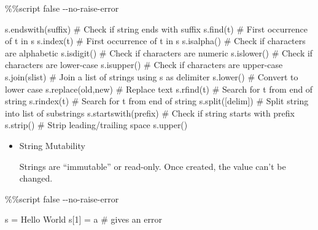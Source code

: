 \documentclass[
  letterpaper,
  DIV=11,
  numbers=noendperiod]{scrreprt}
\newenvironment{Shaded}{\begin{snugshade}}{\end{snugshade}}
\newcommand{\CommentTok}[1]{\textcolor[rgb]{0.37,0.37,0.37}{#1}}
\newcommand{\ControlFlowTok}[1]{\textcolor[rgb]{0.00,0.46,0.62}{#1}}
\newcommand{\DecValTok}[1]{\textcolor[rgb]{0.68,0.00,0.00}{#1}}
\newcommand{\NormalTok}[1]{\textcolor[rgb]{0.00,0.46,0.62}{#1}}
\newcommand{\OperatorTok}[1]{\textcolor[rgb]{0.37,0.37,0.37}{#1}}
\newcommand{\StringTok}[1]{\textcolor[rgb]{0.13,0.47,0.30}{#1}}
\begin{document}
\begin{Shaded}
\begin{Highlighting}[]
\OperatorTok{\%\%}\NormalTok{script false }\OperatorTok{{-}{-}}\NormalTok{no}\OperatorTok{{-}}\ControlFlowTok{raise}\OperatorTok{{-}}\NormalTok{error}

\NormalTok{s.endswith(suffix)     }\CommentTok{\# Check if string ends with suffix}
\NormalTok{s.find(t)              }\CommentTok{\# First occurrence of t in s}
\NormalTok{s.index(t)             }\CommentTok{\# First occurrence of t in s}
\NormalTok{s.isalpha()            }\CommentTok{\# Check if characters are alphabetic}
\NormalTok{s.isdigit()            }\CommentTok{\# Check if characters are numeric}
\NormalTok{s.islower()            }\CommentTok{\# Check if characters are lower{-}case}
\NormalTok{s.isupper()            }\CommentTok{\# Check if characters are upper{-}case}
\NormalTok{s.join(slist)          }\CommentTok{\# Join a list of strings using s as delimiter}
\NormalTok{s.lower()              }\CommentTok{\# Convert to lower case}
\NormalTok{s.replace(old,new)     }\CommentTok{\# Replace text}
\NormalTok{s.rfind(t)             }\CommentTok{\# Search for t from end of string}
\NormalTok{s.rindex(t)            }\CommentTok{\# Search for t from end of string}
\NormalTok{s.split([delim])       }\CommentTok{\# Split string into list of substrings}
\NormalTok{s.startswith(prefix)   }\CommentTok{\# Check if string starts with prefix}
\NormalTok{s.strip()              }\CommentTok{\# Strip leading/trailing space}
\NormalTok{s.upper()  }
\end{Highlighting}
\end{Shaded}

\begin{itemize}
\item
  String Mutability

  Strings are ``immutable'' or read-only. Once created, the value can't
  be changed.
\end{itemize}

\begin{Shaded}
\begin{Highlighting}[]
\OperatorTok{\%\%}\NormalTok{script false }\OperatorTok{{-}{-}}\NormalTok{no}\OperatorTok{{-}}\ControlFlowTok{raise}\OperatorTok{{-}}\NormalTok{error}

\NormalTok{s }\OperatorTok{=} \StringTok{\textquotesingle{}Hello World\textquotesingle{}}
\NormalTok{s[}\DecValTok{1}\NormalTok{] }\OperatorTok{=} \StringTok{\textquotesingle{}a\textquotesingle{}} \CommentTok{\# gives an error}
\end{Highlighting}
\end{Shaded}
\end{document}
